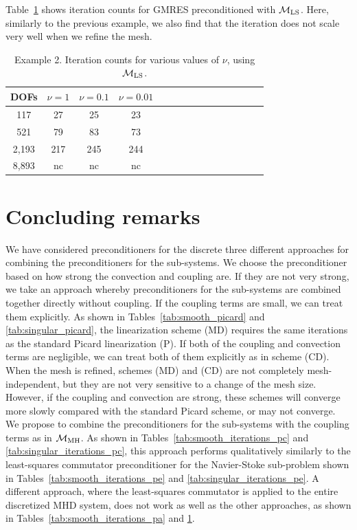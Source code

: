 \documentclass{siamltex}
\begin{document}
Table~\ref{tab:singular_iterations_pa} shows iteration counts for GMRES preconditioned with $\mathcal{M}_{\rm LS}$. Here, similarly to the previous example, we also find that the iteration does not scale very well when we refine the mesh.

\begin{table}[!ht]
\begin{center}
\begin{tabular}{ccccccccccccccc}
\hline
DOFs& $\nu = 1$ & $\nu = 0.1$ & $\nu = 0.01$ \\
\hline
117 & 27 & 25 & 23\\
521 & 79 & 83 & 73\\
2,193 & 217 & 245 & 244\\
8,893 & nc & nc & nc\\
\hline
\end{tabular}
\caption{Example 2. Iteration counts for various values of $\nu$, using $\mathcal{M}_{\rm LS}$.}
\label{tab:singular_iterations_pa}
\end{center}
\end{table}

\section{Concluding remarks}
\label{sec:conclusions}
We have considered preconditioners for the discrete three different approaches for combining the preconditioners
for the sub-systems. We choose the preconditioner based on how strong the convection and coupling are. If they are not very strong, we take an approach whereby preconditioners for the sub-systems are combined together directly without coupling. If the coupling terms are small, we can treat them explicitly. As shown in Tables~\ref{tab:smooth_picard} and \ref{tab:singular_picard}, the linearization scheme (MD) requires the same iterations as the standard Picard linearization (P).  If both of the coupling and convection terms are negligible,  we can treat both of them explicitly as in scheme (CD). When the mesh is refined, schemes (MD) and (CD) are not completely mesh-independent, but they are not very sensitive to a change of the mesh size. However, if the coupling and convection are strong, these schemes will converge more slowly compared with the standard Picard scheme, or may not converge. We propose to combine the preconditioners for the sub-systems with the coupling terms as in $\mathcal{M}_{\rm MH}$. As shown in Tables~\ref{tab:smooth_iterations_pc} and \ref{tab:singular_iterations_pc}, this approach performs qualitatively similarly to the least-squares commutator preconditioner for the Navier-Stoke sub-problem shown in Tables~\ref{tab:smooth_iterations_pe} and \ref{tab:singular_iterations_pe}. A different approach, where the least-squares commutator is applied to the entire discretized MHD system, does not work as well as the other approaches, as shown in Tables~\ref{tab:smooth_iterations_pa} and \ref{tab:singular_iterations_pa}.
\end{document}
